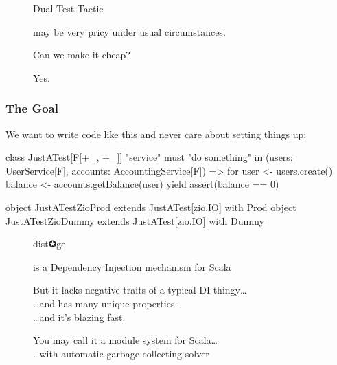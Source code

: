 \documentclass[usenames,dvipsnames,aspectratio=169]{beamer}
\begin{document}
\begin{frame}
  \begin{figure}
  \Huge Dual Test Tactic
  \end{figure}

  \begin{figure}
  \LARGE may be very pricy under usual circumstances.
  \end{figure}
\end{frame}

\begin{frame}
  \begin{figure}
  \Huge Can we make it cheap?           
  \end{figure}
\end{frame}

\begin{frame}
  \begin{figure}
  \Huge Yes.
  \end{figure}
\end{frame}


\begin{frame}[fragile]
\frametitle{The Goal}

We want to write code like this and never care about setting things up:

\begin{scalacode}
class JustATest[F[+_, +_]] {
  "service" must {
    "do something" in {
      (users: UserService[F], accounts: AccountingService[F]) =>
      for {
        user  <- users.create()
        balance <- accounts.getBalance(user)
      } yield {
        assert(balance == 0)
      }
    }
  }
}

object JustATestZioProd extends JustATest[zio.IO] with Prod
object JustATestZioDummy extends JustATest[zio.IO] with Dummy
\end{scalacode}
\end{frame}

\begin{frame}
  \begin{figure}
  \Huge \color{RubineRed} dist✪ge
  \end{figure}

  \begin{figure}
  \LARGE is a Dependency Injection mechanism for Scala
  \end{figure}

  \begin{figure}
  \large But it lacks negative traits of a typical DI thingy\dots \\
  \Large \dots and has many unique properties. \\
  \dots and it's blazing fast.
  \end{figure}

  \begin{figure}
  \large You may call it a module system for Scala\dots \\
  \Large \dots with automatic garbage-collecting solver
  \end{figure}
\end{frame}
\end{document}
